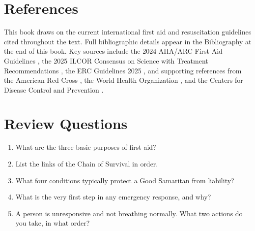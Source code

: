

\section{References}

This book draws on the current international first aid and resuscitation guidelines cited throughout the text. Full bibliographic details appear in the Bibliography at the end of this book. Key sources include the 2024 AHA/ARC First Aid Guidelines \cite{aha_arc_2024}, the 2025 ILCOR Consensus on Science with Treatment Recommendations \cite{ilcor_2025}, the ERC Guidelines 2025 \cite{erc_2025}, and supporting references from the American Red Cross \cite{arc_2020}, the World Health Organization \cite{who_2018}, and the Centers for Disease Control and Prevention \cite{cdc}.

\section{Review Questions}

\begin{enumerate}[leftmargin=*]
\item What are the three basic purposes of first aid?
\item List the links of the Chain of Survival in order.
\item What four conditions typically protect a Good Samaritan from liability?
\item What is the very first step in any emergency response, and why?
\item A person is unresponsive and not breathing normally. What two actions do you take, in what order?
\end{enumerate}
